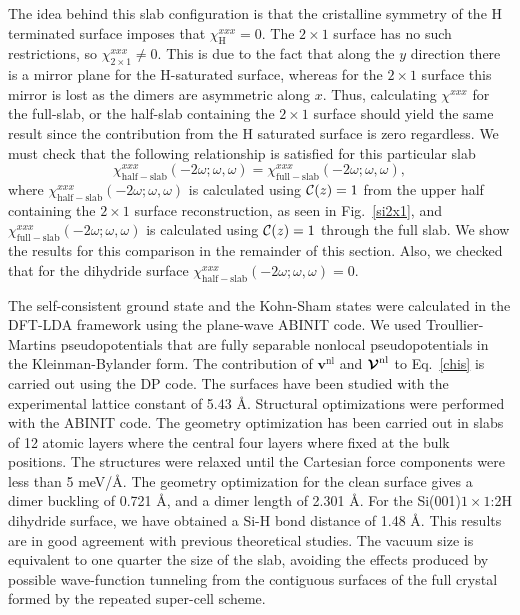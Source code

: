 The idea behind this slab configuration is that the cristalline symmetry of the
H terminated surface imposes that $\chi_{\mathrm{H}}^{xxx}=0$. The $2\times 1$
surface has no such restrictions, so $\chi_{2\times 1}^{xxx}\ne 0$. This is due
to the fact that along the $y$ direction there is a mirror plane for the
H-saturated surface, whereas for the $2\times 1$ surface this mirror is lost as
the dimers are asymmetric along $x$. Thus, calculating $\chi^{xxx}$ for the
full-slab, or the half-slab containing the $2\times 1$ surface\cite{note1}
should yield the same result since the contribution from the H saturated surface
is zero regardless. We must check that the following relationship is satisfied
for this particular slab
\begin{equation*}
\chi_{\mathrm{half-slab}}^{xxx}(-2\omega;\omega,\omega) 
=
\chi_{\mathrm{full-slab}}^{xxx}(-2\omega;\omega,\omega) 
,
\end{equation*}
where $\chi_{\mathrm{half-slab}}^{xxx}(-2\omega;\omega,\omega)$ is calculated
using ${\mathbf{\cal C}}(z)=1$ from the upper half containing the $2\times 1$
surface reconstruction, as seen in Fig.~\ref{si2x1}, and
$\chi_{\mathrm{full-slab}}^{xxx}(-2\omega;\omega,\omega)$ is calculated using
${\mathbf{\cal C}}(z)=1$ through the full slab. We show the results for this
comparison in the remainder of this section. Also, we checked that for the
dihydride surface $\chi_{\mathrm{half-slab}}^{xxx}(-2\omega;\omega,\omega)=0$.

The self-consistent ground state and the Kohn-Sham states were calculated in the
DFT-LDA framework using the plane-wave ABINIT code.\cite{abinit} We used
Troullier-Martins pseudopotentials\cite{troullierPRB91} that are fully separable
nonlocal pseudopotentials in the Kleinman-Bylander form.\cite{kleinmanPRL82} The
contribution of $\mathbf{v}^\mathrm{nl}$ and $\boldsymbol{\mathcal{\cal
V}}^\mathrm{nl}$ to Eq.~\eqref{chis} is carried out using the DP
code.\cite{olevanoDP} The surfaces have been studied with the experimental
lattice constant of 5.43 \AA. Structural optimizations were performed with the
ABINIT code.\cite{abinit} The geometry optimization has been carried out in
slabs of 12 atomic layers where the central four layers where fixed at the bulk
positions. The structures were relaxed until the Cartesian force components were
less than 5 meV/\AA. The geometry optimization for the clean surface gives a
dimer buckling of 0.721 \AA, and a dimer length of 2.301 \AA. For the
Si(001)$1\times 1$:2H dihydride surface, we have obtained a Si-H bond distance
of 1.48 \AA. This results are in good agreement with previous theoretical
studies.\cite{caramellaPRB09,mendozaPRB06} The vacuum size is equivalent to one
quarter the size of the slab, avoiding the effects produced by possible
wave-function tunneling from the contiguous surfaces of the full crystal formed
by the repeated super-cell scheme.\cite{mendozaPRB06}

